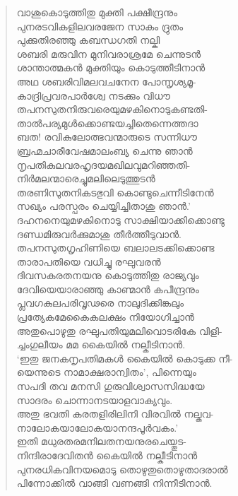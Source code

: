 \begin{verse}
വാശുകൊടുത്തിതു മുക്തി പക്ഷീന്ദ്രനും\\
പുനരടവികളിലവരജേന സാകം ദ്രുതം\\
പുക്കുതിരഞ്ഞു കബന്ധഗതി നല്കി\\
ശബരി മരുവിന മുനിവരാശ്രമേ ചെന്നുടന്‍\\
ശാന്താത്മകന്‍ മുക്തിയും കൊടുത്തീടിനാന്‍\\
അഥ ശബരിവിമലവചനേന പോന്നൃശ്യമൂ-\\
കാദ്രിപ്രവരപാര്‍ശ്വേ നടക്കും വിധൗ\\
തപനസുതനിരുവരെയുമഴകിനൊടുകണ്ടതി-\\
താല്‍പര്യമുള്‍ക്കൊണ്ടയച്ചിതെന്നെത്തദാ\\
ബത! രവികുലോത്ഭവന്മാരുടെ സന്നിധൗ\\
ബ്രഹ്മചാരീവേഷമാലംബ്യ ചെന്നു ഞാന്‍\\
നൃപതികുലവരഹൃദയമഖിലവുമറിഞ്ഞതി-\\
നിര്‍മലന്മാരെച്ചുമലിലെടുത്തുടന്‍\\
തരണിസുതനികടഭുവി കൊണ്ടുചെന്നീടിനേന്‍\\
സഖ്യം പരസ്പരം ചെയ്യിച്ചിതാശു ഞാന്‍.’\\
ദഹനനെയുമഴകിനൊടു സാക്ഷിയാക്കിക്കൊണ്ടു\\
ദണ്ഡമിരുവര്‍ക്കുമാശു തീര്‍ത്തീടുവാന്‍.\\
തപനസുതഗൃഹിണിയെ ബലാലടക്കിക്കൊണ്ട\\
താരാപതിയെ വധിച്ചു രഘുവരന്‍\\
ദിവസകരതനയനു കൊടുത്തിതു രാജ്യവും\\
ദേവിയെയാരാഞ്ഞു കാണ്മാന്‍ കപീന്ദ്രനും\\
പ്ലവഗകുലപരിവൃഢരെ നാലുദിക്കിങ്കലും\\
പ്രത്യേകമേകൈകലക്ഷം നിയോഗിച്ചാന്‍\\
അതുപൊഴുതു രഘുപതിയുമലിവൊടരികേ വിളി-\\
ച്ചംഗുലീയം മമ കൈയില്‍ നല്കീടിനാന്‍.\\
‘ഇതു ജനകനൃപതിമകള്‍ കൈയില്‍ കൊടുക്ക നീ-\\
യെന്നുടെ നാമാക്ഷരാന്വിതം’, പിന്നെയും\\
സപദി തവ മനസി ഗുരുവിശ്വാസസിദ്ധയേ\\
സാദരം ചൊന്നാനടയാളവാക്യവും.\\
അതു ഭവതി കരതളിരിലിനി വിരവില്‍ നല്കുവ-\\
നാലോകയാലോകയാനന്ദപൂര്‍വകം.’\\
ഇതി മധുരതരമനിലതനയനുരചെയ്തുട-\\
നിന്ദിരാദേവിതന്‍ കൈയില്‍ നല്കീടിനാന്‍\\
പുനരധികവിനയമൊടു തൊഴുതുതൊഴുതാദരാല്‍\\
പിന്നോക്കില്‍ വാങ്ങി വണങ്ങി നിന്നീടിനാന്‍.\\

\end{verse}
